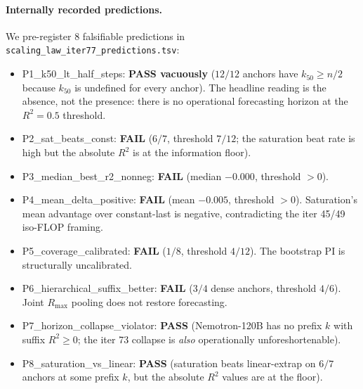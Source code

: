 \paragraph{Internally recorded predictions.}
\label{par:scaling-iter77-preds}
We pre-register 8 falsifiable predictions in
\texttt{scaling\_law\_iter77\_predictions.tsv}:
\begin{itemize}
  \item P1\_k50\_lt\_half\_steps: \textbf{PASS vacuously} ($12/12$
        anchors have $k_{50} \geq n/2$ because $k_{50}$ is undefined for
        every anchor).  The headline reading is the absence, not the
        presence: there is no operational forecasting horizon at the
        $R^2 = 0.5$ threshold.
  \item P2\_sat\_beats\_const: \textbf{FAIL} ($6/7$, threshold $7/12$;
        the saturation beat rate is high but the absolute $R^2$ is
        at the information floor).
  \item P3\_median\_best\_r2\_nonneg: \textbf{FAIL} (median $-0.000$,
        threshold $> 0$).
  \item P4\_mean\_delta\_positive: \textbf{FAIL} (mean $-0.005$,
        threshold $> 0$).  Saturation's mean advantage over
        constant-last is negative, contradicting the iter 45/49
        iso-FLOP framing.
  \item P5\_coverage\_calibrated: \textbf{FAIL} ($1/8$, threshold
        $4/12$).  The bootstrap PI is structurally uncalibrated.
  \item P6\_hierarchical\_suffix\_better: \textbf{FAIL} ($3/4$ dense
        anchors, threshold $4/6$).  Joint $R_\mathrm{max}$ pooling
        does not restore forecasting.
  \item P7\_horizon\_collapse\_violator: \textbf{PASS}
        (Nemotron-120B has no prefix $k$ with suffix $R^2 \geq 0$;
        the iter 73 collapse is \emph{also} operationally
        unforeshortenable).
  \item P8\_saturation\_vs\_linear: \textbf{PASS} (saturation beats
        linear-extrap on $6/7$ anchors at some prefix $k$, but the
        absolute $R^2$ values are at the floor).
\end{itemize}


